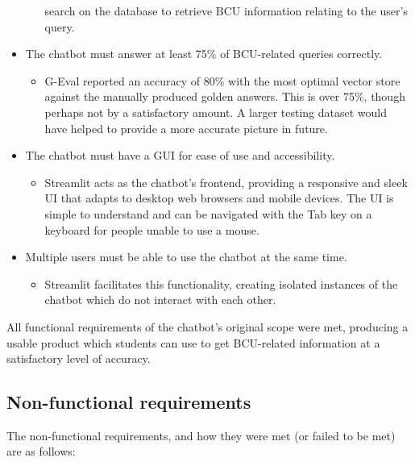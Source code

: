 \begin{itemize}
\begin{itemize}
        search on the database to retrieve BCU information relating to the user's query.
    \end{itemize}
    \item The chatbot must answer at least 75\% of BCU-related queries correctly.
    \begin{itemize}
        \item G-Eval reported an accuracy of 80\% with the most optimal vector store against the manually produced golden answers. This is over 75\%,
        though perhaps not by a satisfactory amount. A larger testing dataset would have helped to provide a more accurate 
        picture in future.
    \end{itemize}
    \item The chatbot must have a GUI for ease of use and accessibility.
    \begin{itemize}
        \item Streamlit acts as the chatbot's frontend, providing a responsive and sleek UI that adapts to 
        desktop web browsers and mobile devices. The UI is simple to understand and can be navigated with the 
        Tab key on a keyboard for people unable to use a mouse.
    \end{itemize}
    \item Multiple users must be able to use the chatbot at the same time.
    \begin{itemize}
        \item Streamlit facilitates this functionality, creating isolated instances of the chatbot which do not interact 
        with each other.
    \end{itemize}
\end{itemize}

\noindent All functional requirements of the chatbot's original scope were met, producing a usable product which students 
can use to get BCU-related information at a satisfactory level of accuracy. 

\subsection{Non-functional requirements}
The non-functional requirements, and how they were met (or failed to be met) are as follows:

